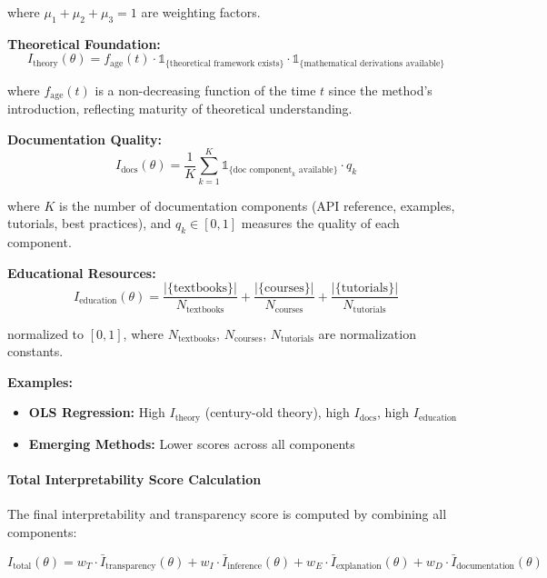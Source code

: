 \documentclass[11pt,a4paper]{article}
\begin{document}
where $\mu_1 + \mu_2 + \mu_3 = 1$ are weighting factors.

\textbf{Theoretical Foundation:}
\begin{equation}
I_{\text{theory}}(\theta) = f_{\text{age}}(t) \cdot \mathbb{1}_{\{\text{theoretical framework exists}\}} \cdot \mathbb{1}_{\{\text{mathematical derivations available}\}}
\end{equation}

where $f_{\text{age}}(t)$ is a non-decreasing function of the time $t$ since the method's introduction, reflecting maturity of theoretical understanding.

\textbf{Documentation Quality:}
\begin{equation}
I_{\text{docs}}(\theta) = \frac{1}{K} \sum_{k=1}^{K} \mathbb{1}_{\{\text{doc component}_k \text{ available}\}} \cdot q_k
\end{equation}

where $K$ is the number of documentation components (API reference, examples, tutorials, best practices), and $q_k \in [0,1]$ measures the quality of each component.

\textbf{Educational Resources:}
\begin{equation}
I_{\text{education}}(\theta) = \frac{|\{\text{textbooks}\}|}{N_{\text{textbooks}}} + \frac{|\{\text{courses}\}|}{N_{\text{courses}}} + \frac{|\{\text{tutorials}\}|}{N_{\text{tutorials}}}
\end{equation}

normalized to $[0,1]$, where $N_{\text{textbooks}}$, $N_{\text{courses}}$, $N_{\text{tutorials}}$ are normalization constants.

\textbf{Examples:}
\begin{itemize}
    \item \textbf{OLS Regression:} High $I_{\text{theory}}$ (century-old theory), high $I_{\text{docs}}$, high $I_{\text{education}}$
    \item \textbf{Emerging Methods:} Lower scores across all components
\end{itemize}

\paragraph{Total Interpretability Score Calculation}

The final interpretability and transparency score is computed by combining all components:

\begin{equation}
I_{\text{total}}(\theta) = w_T \cdot \bar{I}_{\text{transparency}}(\theta) + w_I \cdot \bar{I}_{\text{inference}}(\theta) + w_E \cdot \bar{I}_{\text{explanation}}(\theta) + w_D \cdot \bar{I}_{\text{documentation}}(\theta)
\label{eq:total_interpretability}
\end{equation}
\end{document}
